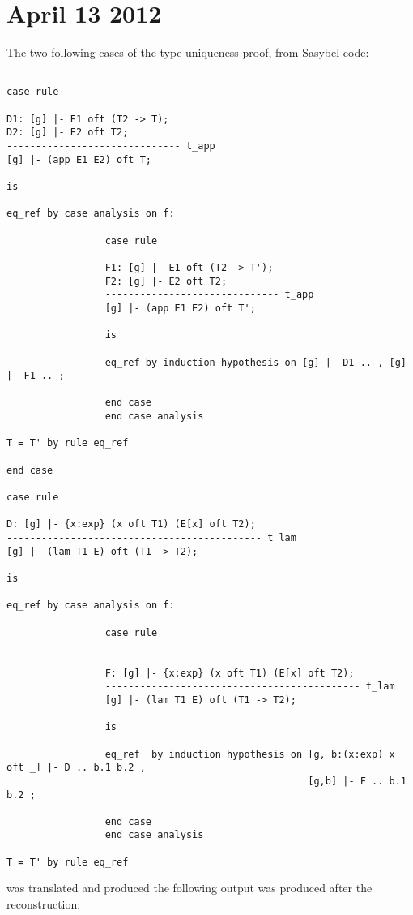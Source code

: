 \documentclass[12pt]{article}
\begin{document}
\section{April 13 2012}
The two following cases of the type uniqueness proof, from \textmd{Sasybel} code:
\footnotesize\begin{verbatim}

case rule

D1: [g] |- E1 oft (T2 -> T);  
D2: [g] |- E2 oft T2;
------------------------------ t_app
[g] |- (app E1 E2) oft T;

is

eq_ref by case analysis on f:

                 case rule

                 F1: [g] |- E1 oft (T2 -> T');  
                 F2: [g] |- E2 oft T2;
                 ------------------------------ t_app
                 [g] |- (app E1 E2) oft T';

                 is 

                 eq_ref by induction hypothesis on [g] |- D1 .. , [g] |- F1 .. ;

                 end case
                 end case analysis

T = T' by rule eq_ref

end case

case rule

D: [g] |- {x:exp} (x oft T1) (E[x] oft T2);
-------------------------------------------- t_lam
[g] |- (lam T1 E) oft (T1 -> T2);

is

eq_ref by case analysis on f:

                 case rule


                 F: [g] |- {x:exp} (x oft T1) (E[x] oft T2);
                 -------------------------------------------- t_lam
                 [g] |- (lam T1 E) oft (T1 -> T2);

                 is 

                 eq_ref  by induction hypothesis on [g, b:(x:exp) x oft _] |- D .. b.1 b.2 , 
                                                    [g,b] |- F .. b.1 b.2 ;

                 end case
                 end case analysis

T = T' by rule eq_ref

\end{verbatim}
was translated and produced the following output was produced after the reconstruction:
\end{document}
